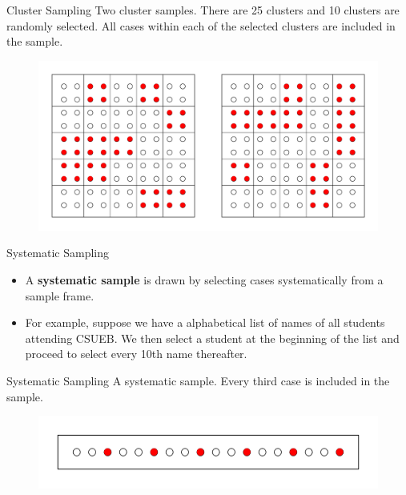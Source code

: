 \documentclass{beamer}
\begin{document}
\begin{frame}{Cluster Sampling}
Two cluster samples.  There are 25 clusters and 10 clusters are randomly selected.  All cases within each of the selected clusters are included in the sample.  
\begin{figure}
\includegraphics[scale=0.4]{figure/clust.pdf}
\end{figure}
\end{frame}

\begin{frame}{Systematic Sampling}
\begin{itemize}
\item A \textbf{systematic sample} is drawn by selecting cases systematically from a sample frame.
\vspace{10pt}
\item For example, suppose we have a alphabetical list of names of all students attending CSUEB.  We then select a student at the beginning of the list and proceed to select every 10th name thereafter.  
\end{itemize}
\end{frame}

\begin{frame}{Systematic Sampling}
A systematic sample.  Every third case is included in the sample.  
\begin{figure}
\includegraphics[scale=0.6]{figure/sys.pdf}
\end{figure}
\end{frame}
\end{document}
